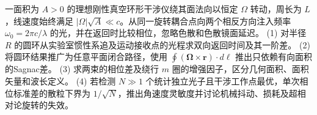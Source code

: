 一面积为 \(A>0\) 的理想刚性真空环形干涉仪绕其面法向以恒定 \(\Omega\) 转动，周长为 \(L\)，线速度始终满足 \(|\Omega|\sqrt A\ll c\)。从同一旋转耦合点向两个相反方向注入频率 \(\omega_0=2\pi c/\lambda\) 的光，并在返回时比较相位，忽略色散和色散镜面延迟。
(1) 对半径 \(R\) 的圆环从实验室惯性系追及运动接收点的光程求双向返回时间及其一阶差。
(2) 将圆环结果推广为任意平面闭合路径，使用 \(\oint(\boldsymbol\Omega\times\boldsymbol r)\cdot d\boldsymbol\ell\) 推出只依赖有向面积的Sagnac差。
(3) 求两束的相位差及绕行 \(m\) 圈的增强因子，区分几何面积、面积矢量和波长定义。
(4) 若检测 \(N\gg1\) 个统计独立光子且干涉工作点最优，单次相位标准差的散粒下界为 \(1/\sqrt N\)，推出角速度灵敏度并讨论机械抖动、损耗及超相对论旋转的失效。
